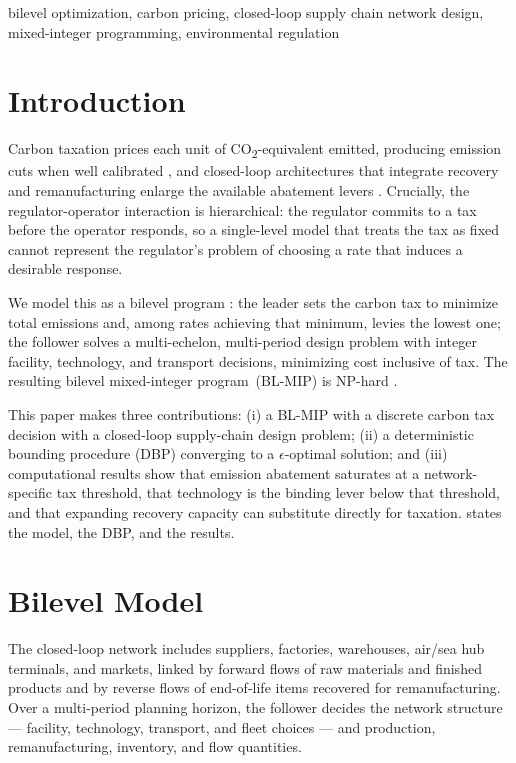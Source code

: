 ﻿\documentclass[conference]{IEEEtran}
\begin{document}
\begin{IEEEkeywords}
bilevel optimization, carbon pricing, closed-loop supply chain network
design, mixed-integer programming, environmental regulation
\end{IEEEkeywords}

\section{Introduction}
\label{sec:intro}

Carbon taxation prices each unit of CO\textsubscript{2}-equivalent
emitted, producing emission cuts when well calibrated \cite{pigou1920}, 
and closed-loop architectures that integrate recovery and remanufacturing 
enlarge the available abatement levers \cite{govindan2015}. Crucially, 
the regulator-operator interaction is hierarchical: the regulator 
commits to a tax before the operator responds, so a single-level model
that treats the tax as fixed cannot represent the regulator's problem of
choosing a rate that induces a desirable response.

We model this as a bilevel program \cite{colson2007}: the leader sets
the carbon tax to minimize total emissions and, among rates achieving
that minimum, levies the lowest one; the follower solves a
multi-echelon, multi-period design problem with integer facility,
technology, and transport decisions, minimizing cost inclusive of tax.
The resulting bilevel mixed-integer program~(BL-MIP) is NP-hard 
\cite{jeroslow1985}.

This paper makes three contributions: (i) a BL-MIP with a discrete 
carbon tax decision with a closed-loop supply-chain design problem;
(ii) a deterministic bounding procedure (DBP) converging to a 
$\epsilon$-optimal solution; and (iii) computational results show 
that emission abatement saturates at a network-specific tax threshold,
that technology is the binding lever below that threshold, and that 
expanding recovery capacity can substitute directly for taxation. 
 states the model,  the DBP, and 
 the results.

\section{Bilevel Model}
\label{sec:model}

The closed-loop network includes suppliers, factories, warehouses,
air/sea hub terminals, and markets, linked by forward flows of raw
materials and finished products and by reverse flows of end-of-life
items recovered for remanufacturing. Over a multi-period planning
horizon, the follower decides the network structure --- facility, 
technology, transport, and fleet choices --- and production,
remanufacturing, inventory, and flow quantities. 
\end{document}

